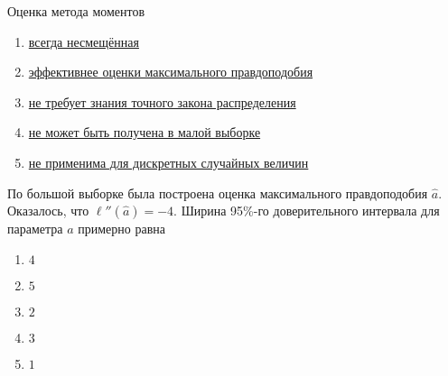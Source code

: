 \documentclass[t]{beamer}
\begin{document}
 \begin{frame} \label{16} 
\begin{block}{16} 

  Оценка метода моментов


 \end{block} 
\begin{enumerate} 
\item[] \hyperlink{16-No}{\beamergotobutton{} всегда несмещённая}
\item[] \hyperlink{16-No}{\beamergotobutton{} эффективнее оценки максимального правдоподобия}
\item[] \hyperlink{16-Yes}{\beamergotobutton{} не требует знания точного закона распределения}
\item[] \hyperlink{16-No}{\beamergotobutton{} не может быть получена в малой выборке}
\item[] \hyperlink{16-No}{\beamergotobutton{} не применима для дискретных случайных величин}
\end{enumerate} 
\end{frame} 


 \begin{frame} \label{17} 
\begin{block}{17} 

   По большой выборке была построена оценка  максимального правдоподобия $\hat a$. Оказалось, что $\ell''(\hat a) = -4$. Ширина 95\%-го доверительного интервала для параметра $a$ примерно равна


 \end{block} 
\begin{enumerate} 
\item[] \hyperlink{17-No}{\beamergotobutton{} $4$}
\item[] \hyperlink{17-No}{\beamergotobutton{} $5$}
\item[] \hyperlink{17-Yes}{\beamergotobutton{} $2$}
\item[] \hyperlink{17-No}{\beamergotobutton{} $3$}
\item[] \hyperlink{17-No}{\beamergotobutton{} $1$}
\end{enumerate} 
\end{frame} 
\end{document}
